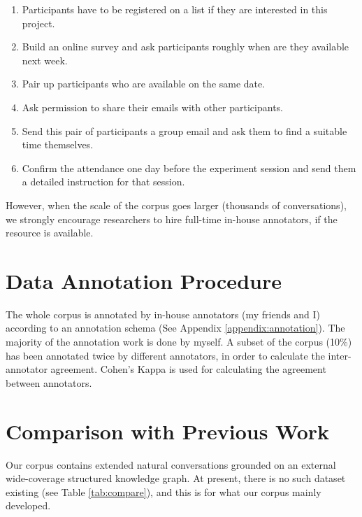 \documentclass[bsc,frontabs,twoside,singlespacing,parskip,deptreport]{infthesis}     %
\begin{document}
\begin{enumerate}

    \item Participants have to be registered on a list if they are interested in this project.

   \item Build an online survey and ask participants roughly when are they available next week.

   \item Pair up participants who are available on the same date.
 
   \item Ask permission to share their emails with other participants.
   
    \item Send this pair of participants a group email and ask them to find a suitable time themselves.

    \item Confirm the attendance one day before the experiment session and send them a detailed instruction for that session.
    
\end{enumerate}

However, when the scale of the corpus goes larger (thousands of conversations), we strongly encourage researchers to hire full-time in-house annotators, if the resource is available.

\section{Data Annotation Procedure}

The whole corpus is annotated by in-house annotators (my friends and I) according to an annotation schema (See Appendix \ref{appendix:annotation}). The majority of the annotation work is done by myself. A subset of the corpus (10\%) has been annotated twice by different annotators, in order to calculate the inter-annotator agreement. Cohen's Kappa is used for calculating the agreement between annotators.

\section{Comparison with Previous Work}

Our corpus contains extended natural conversations grounded on an external wide-coverage structured knowledge graph. At present, there is no such dataset existing (see Table \ref{tab:compare}), and this is for what our corpus mainly developed.
\end{document}
